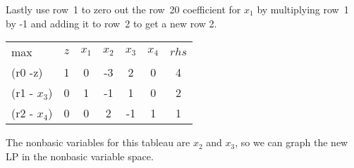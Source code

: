Lastly use row~1 to zero out the row~20 coefficient for $x_1$ by multiplying row~1 by -1 and adding it to row~2 to get a new row 2. \\


\begin{center} \begin{tabular} {l|c||c|c|c|c|c|}  \cline{2-7}
max 			& $z$	& $x_1$ & $x_2$  & $x_3$	& $x_4$	& $rhs$ \\ \cline{2-7}
(r0 -z)	    	& 1		& 0     & -3     &	 2 	&	  0	&   4    \\ \cline{2-7}
(r1 - $x_3$)	& 0		& 1     & -1     &	 1 	&	  0 &	2   \\
(r2 - $x_4$)	& 0		& 0     &  2    &	-1 	&	  1 &	1   \\ \cline{2-7}
\end{tabular} \end{center}

\newpage The nonbasic variables for this tableau are $x_2$ and $x_3$, so we can graph the new LP in the nonbasic variable space.

